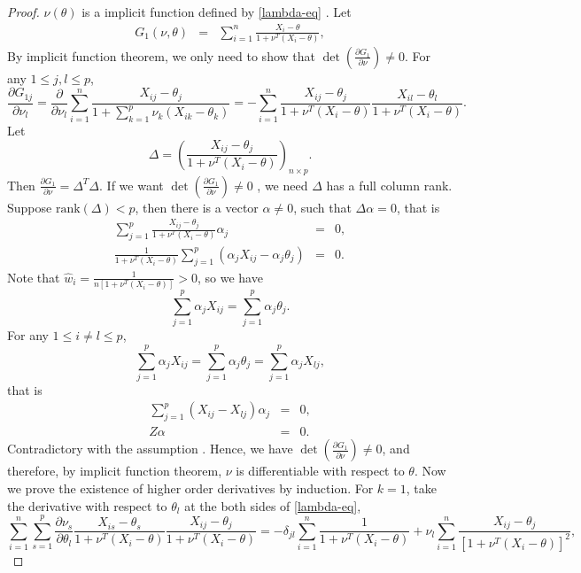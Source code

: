 \documentclass[oneside,english]{amsbook}
\numberwithin{section}{chapter}
\numberwithin{equation}{section}
\numberwithin{figure}{section}
\theoremstyle{plain}
\theoremstyle{plain}
\theoremstyle{definition}
\theoremstyle{plain}
\theoremstyle{plain}
\theoremstyle{remark}
\theoremstyle{definition}
\theoremstyle{definition}
\begin{document}
\begin{proof}
$\nu\left(\theta\right)$ is a implicit function defined by \eqref{lambda-eq}
. Let 
\begin{eqnarray*}
G_{1}\left(\nu,\theta\right) & = & \sum_{i=1}^{n}\frac{X_{i}-\theta}{1+\nu^{T}\left(X_{i}-\theta\right)},
\end{eqnarray*}
By implicit function theorem, we only need to show that $\det\left(\frac{\partial G_{1}}{\partial\nu}\right)\neq0$.
For any $1\le j,l\le p$, 
\[
\frac{\partial G_{1j}}{\partial\nu_{l}}=\frac{\partial}{\partial\nu_{l}}\sum_{i=1}^{n}\frac{X_{ij}-\theta_{j}}{1+\sum_{k=1}^{p}\nu_{k}\left(X_{ik}-\theta_{k}\right)}=-\sum_{i=1}^{n}\frac{X_{ij}-\theta_{j}}{1+\nu^{T}\left(X_{i}-\theta\right)}\frac{X_{il}-\theta_{l}}{1+\nu^{T}\left(X_{i}-\theta\right)}.
\]
Let 
\[
\Delta=\left(\frac{X_{ij}-\theta_{j}}{1+\nu^{T}\left(X_{i}-\theta\right)}\right)_{n\times p}.
\]
Then $\frac{\partial G_{1}}{\partial\nu}=\Delta^{T}\Delta$. If we
want $\det\left(\frac{\partial G_{1}}{\partial\nu}\right)\neq0$ ,
we need $\Delta$ has a full column rank. Suppose $\mathrm{rank}\left(\Delta\right)<p$,
then there is a vector $\alpha\neq0$, such that $\Delta\alpha=0$,
that is 
\begin{eqnarray*}
\sum_{j=1}^{p}\frac{X_{ij}-\theta_{j}}{1+\nu^{T}\left(X_{i}-\theta\right)}\alpha_{j} & = & 0,\\
\frac{1}{1+\nu^{T}\left(X_{i}-\theta\right)}\sum_{j=1}^{p}\left(\alpha_{j}X_{ij}-\alpha_{j}\theta_{j}\right) & = & 0.
\end{eqnarray*}
Note that $\hat{w}_{i}=\frac{1}{n\left[1+\nu^{T}\left(X_{i}-\theta\right)\right]}>0$,
so we have 
\[
\sum_{j=1}^{p}\alpha_{j}X_{ij}=\sum_{j=1}^{p}\alpha_{j}\theta_{j}.
\]
For any $1\le i\neq l\le p$, 
\[
\sum_{j=1}^{p}\alpha_{j}X_{ij}=\sum_{j=1}^{p}\alpha_{j}\theta_{j}=\sum_{j=1}^{p}\alpha_{j}X_{lj},
\]
that is 
\begin{eqnarray*}
\sum_{j=1}^{p}\left(X_{ij}-X_{lj}\right)\alpha_{j} & = & 0,\\
Z\alpha & = & 0.
\end{eqnarray*}
Contradictory with the assumption .
Hence, we have $\det\left(\frac{\partial G_{1}}{\partial\nu}\right)\neq0$,
and therefore, by implicit function theorem, $\nu$ is differentiable
with respect to $\theta$. Now we prove the existence of higher order
derivatives by induction. For $k=1$, take the derivative with respect
to $\theta_{l}$ at the both sides of \eqref{lambda-eq}, 
\[
\sum_{i=1}^{n}\sum_{s=1}^{p}\frac{\partial\nu_{s}}{\partial\theta_{l}}\frac{X_{is}-\theta_{s}}{1+\nu^{T}\left(X_{i}-\theta\right)}\frac{X_{ij}-\theta_{j}}{1+\nu^{T}\left(X_{i}-\theta\right)}=-\delta_{jl}\sum_{i=1}^{n}\frac{1}{1+\nu^{T}\left(X_{i}-\theta\right)}+\nu_{l}\sum_{i=1}^{n}\frac{X_{ij}-\theta_{j}}{\left[1+\nu^{T}\left(X_{i}-\theta\right)\right]^{2}},
\]
\end{proof}
\end{document}
